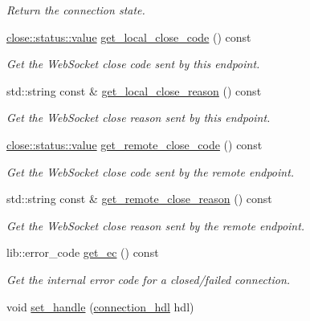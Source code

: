 \begin{DoxyCompactItemize}
\begin{DoxyCompactList}\small\item\em Return the connection state. \end{DoxyCompactList}\item 
\hyperlink{namespacewebsocketpp_1_1close_1_1status_a8614a5c4733d708e2d2a32191c5bef84}{close\+::status\+::value} \hyperlink{classwebsocketpp_1_1connection_a871a1374bb7330126bfe3f535753cc52}{get\+\_\+local\+\_\+close\+\_\+code} () const
\begin{DoxyCompactList}\small\item\em Get the Web\+Socket close code sent by this endpoint. \end{DoxyCompactList}\item 
std\+::string const  \& \hyperlink{classwebsocketpp_1_1connection_a5ac5746742be51cc68c15a8cfaf962c8}{get\+\_\+local\+\_\+close\+\_\+reason} () const
\begin{DoxyCompactList}\small\item\em Get the Web\+Socket close reason sent by this endpoint. \end{DoxyCompactList}\item 
\hyperlink{namespacewebsocketpp_1_1close_1_1status_a8614a5c4733d708e2d2a32191c5bef84}{close\+::status\+::value} \hyperlink{classwebsocketpp_1_1connection_aad217d74120fb96a39d71c330e0ffa41}{get\+\_\+remote\+\_\+close\+\_\+code} () const
\begin{DoxyCompactList}\small\item\em Get the Web\+Socket close code sent by the remote endpoint. \end{DoxyCompactList}\item 
std\+::string const  \& \hyperlink{classwebsocketpp_1_1connection_a84cba269aca634a5e7729e88b13a44c7}{get\+\_\+remote\+\_\+close\+\_\+reason} () const
\begin{DoxyCompactList}\small\item\em Get the Web\+Socket close reason sent by the remote endpoint. \end{DoxyCompactList}\item 
lib\+::error\+\_\+code \hyperlink{classwebsocketpp_1_1connection_a8c05c88d471342673abf0e5ce60aa4cc}{get\+\_\+ec} () const
\begin{DoxyCompactList}\small\item\em Get the internal error code for a closed/failed connection. \end{DoxyCompactList}\item 
void \hyperlink{classwebsocketpp_1_1connection_af07f4fac45e1b64de7e0d12ece0d23a8}{set\+\_\+handle} (\hyperlink{namespacewebsocketpp_a6b3d26a10ee7229b84b776786332631d}{connection\+\_\+hdl} hdl)

\end{DoxyCompactItemize}
